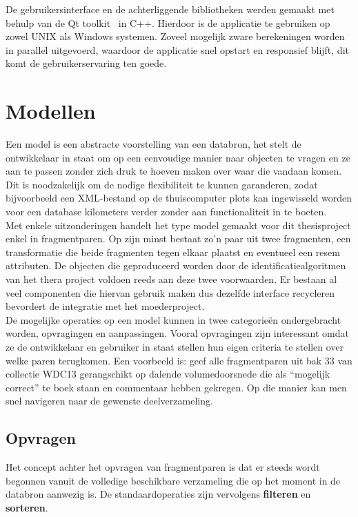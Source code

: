 De gebruikersinterface en de achterliggende bibliotheken werden gemaakt met behulp van de Qt toolkit~\cite{qtdoc} in C++. Hierdoor is de applicatie te gebruiken op zowel UNIX als Windows systemen. Zoveel mogelijk zware berekeningen worden in parallel uitgevoerd, waardoor de applicatie snel opstart en responsief blijft, dit komt de gebruikerservaring ten goede.\\

\section{Modellen}
Een model is een abstracte voorstelling van een databron, het stelt de ontwikkelaar in staat om op een eenvoudige manier naar objecten te vragen en ze aan te passen zonder zich druk te hoeven maken over waar die vandaan komen. Dit is noodzakelijk om de nodige flexibiliteit te kunnen garanderen, zodat bijvoorbeeld een XML-bestand op de thuiscomputer plots kan ingewisseld worden voor een database kilometers verder zonder aan functionaliteit in te boeten.\\

Met enkele uitzonderingen handelt het type model gemaakt voor dit thesisproject enkel in fragmentparen. Op zijn minst bestaat zo'n paar uit twee fragmenten, een transformatie die beide fragmenten tegen elkaar plaatst en eventueel een resem attributen. De objecten die geproduceerd worden door de identificatiealgoritmen van het thera project voldoen reeds aan deze twee voorwaarden. Er bestaan al veel componenten die hiervan gebruik maken dus dezelfde interface recycleren bevordert de integratie met het moederproject.\\

De mogelijke operaties op een model kunnen in twee categorie\"en ondergebracht worden, opvragingen en aanpassingen. Vooral opvragingen zijn interessant omdat ze de ontwikkelaar en gebruiker in staat stellen hun eigen criteria te stellen over welke paren terugkomen. Een voorbeeld is: geef alle fragmentparen uit bak 33 van collectie WDC13 gerangschikt op dalende volumedoorsnede die als ``mogelijk correct'' te boek staan en commentaar hebben gekregen. Op die manier kan men snel navigeren naar de gewenste deelverzameling.

\subsection{Opvragen}
Het concept achter het opvragen van fragmentparen is dat er steeds wordt begonnen vanuit de volledige beschikbare verzameling die op het moment in de databron aanwezig is. De standaardoperaties zijn vervolgens \textbf{filteren} en \textbf{sorteren}. \\

